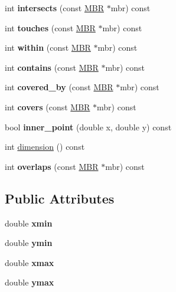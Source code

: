 \begin{DoxyCompactItemize}
\mbox{\label{structMBR_af0dc28de7c9a1858c2f68a84dd66ce2c}} 
int {\bfseries intersects} (const \mbox{\hyperlink{structMBR}{M\+BR}} $\ast$mbr) const
\item 
\mbox{\label{structMBR_a3379d108d4306ac49761c8a602e1da22}} 
int {\bfseries touches} (const \mbox{\hyperlink{structMBR}{M\+BR}} $\ast$mbr) const
\item 
\mbox{\label{structMBR_a7518ac4d8e9ec41306c8b29dd8b4b1d0}} 
int {\bfseries within} (const \mbox{\hyperlink{structMBR}{M\+BR}} $\ast$mbr) const
\item 
\mbox{\label{structMBR_a49091fa440cb4a00d08faf5a2b40291d}} 
int {\bfseries contains} (const \mbox{\hyperlink{structMBR}{M\+BR}} $\ast$mbr) const
\item 
\mbox{\label{structMBR_a098223db5cc9d49df2976e28b9d45b15}} 
int {\bfseries covered\+\_\+by} (const \mbox{\hyperlink{structMBR}{M\+BR}} $\ast$mbr) const
\item 
\mbox{\label{structMBR_a76e25947b90ab0fbf2366252f916cb91}} 
int {\bfseries covers} (const \mbox{\hyperlink{structMBR}{M\+BR}} $\ast$mbr) const
\item 
\mbox{\label{structMBR_aa179d0363e1d080cbd6f11faff033a37}} 
bool {\bfseries inner\+\_\+point} (double x, double y) const
\item 
int \mbox{\hyperlink{structMBR_a26ccb0cfb2eeffbcec91b2640f234374}{dimension}} () const
\item 
\mbox{\label{structMBR_a5257f36a187278b4273c2f3e568dce64}} 
int {\bfseries overlaps} (const \mbox{\hyperlink{structMBR}{M\+BR}} $\ast$mbr) const
\end{DoxyCompactItemize}
\subsection*{Public Attributes}
\begin{DoxyCompactItemize}
\item 
\mbox{\label{structMBR_a037cb7619d9a975d4c0c4629a2504484}} 
double {\bfseries xmin}
\item 
\mbox{\label{structMBR_aeeb7d730381e51fdd9fc85b98a8ef53f}} 
double {\bfseries ymin}
\item 
\mbox{\label{structMBR_ab586aa910440bf7205cb2115505abb80}} 
double {\bfseries xmax}
\item 
\mbox{\label{structMBR_a63888f0d7b224e7a8a71e38e8b320ef7}} 
double {\bfseries ymax}
\end{DoxyCompactItemize}


